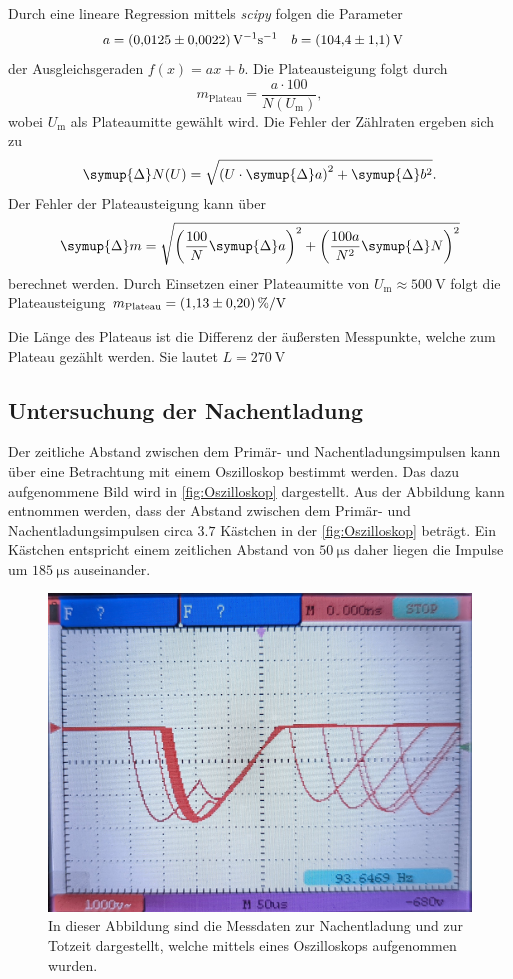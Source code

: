 Durch eine lineare Regression mittels \textit{scipy} \cite{scipy} folgen die Parameter
\begin{align*}
  a &= \qty{0.0125+-0.0022}{\volt^{-1}\second^{-1}} & b &= \qty{104.4+-1.1}{\volt}
\end{align*}
der Ausgleichsgeraden $f(x) = ax + b$.
Die Plateausteigung folgt durch 
\begin{equation*}
  m_\text{Plateau} = \frac{a \cdot 100}{N(U_\text{m})},
\end{equation*}
wobei $U_\text{m}$ als Plateaumitte gewählt wird.
Die Fehler der Zählraten ergeben sich zu 
\begin{equation*}
  \symup{\Delta}N(U) = \sqrt{\left(U \cdot \symup{\Delta}a\right)^2 + \symup{\Delta}b^2}.
\end{equation*}
Der Fehler der Plateausteigung kann über 
\begin{equation*}
  \symup{\Delta}m = \sqrt{\left(\frac{100}{N}\symup{\Delta}a\right)^2 + \left(\frac{100a}{N^2} \symup{\Delta}N\right)^2}
\end{equation*}
berechnet werden. Durch Einsetzen einer Plateaumitte von $U_\text{m} \approx \qty{500}{\volt}$ folgt die Plateausteigung
$m_\text{Plateau} = \qty{1.13+-0.20}{\percent\per\volt}$ 

Die Länge des Plateaus ist die Differenz der äußersten Messpunkte,
welche zum Plateau gezählt werden. Sie lautet $L = \qty{270}{\volt}$

\subsection{Untersuchung der Nachentladung}
\label{subsec:Nachentladung}
Der zeitliche Abstand zwischen dem Primär- und Nachentladungsimpulsen kann über eine Betrachtung mit einem Oszilloskop bestimmt werden. Das dazu aufgenommene Bild wird in 
\autoref{fig:Oszilloskop} dargestellt. Aus der Abbildung kann entnommen werden, dass der Abstand zwischen dem Primär- und Nachentladungsimpulsen circa $\num{3.7}$ Kästchen 
in der \autoref{fig:Oszilloskop} beträgt. Ein Kästchen entspricht einem zeitlichen Abstand von $\qty{50}{\micro\second}$ daher liegen die Impulse um $\qty{185}{\micro\second}$
auseinander.
\begin{figure}
  \centering
  \includegraphics[width = .7\textwidth]{content/Oszilloskop_bild.jpg}
  \caption{In dieser Abbildung sind die Messdaten zur Nachentladung und zur Totzeit dargestellt, welche mittels eines Oszilloskops aufgenommen wurden.}
  \label{fig:Oszilloskop}
\end{figure}

